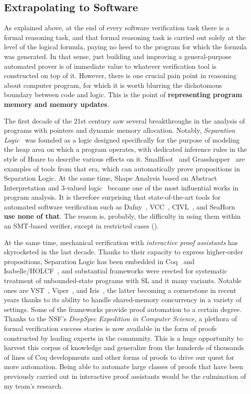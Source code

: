 \subsection{Extrapolating to Software}

As explained above, at the end of every software verification task there is a formal reasoning task, and that formal reasoning task is carried out solely at the level of the logical formula, paying no heed to the program for which the formula was generated.
In that sense, just building and improving a general-purpose automated prover is of immediate value to whatever verification tool is constructed on top of it.
However, there is one crucial pain point in reasoning about computer program, for which it is worth blurring the dichotomous boundary between code and logic.
This is the point of \textbf{representing program memory and memory updates}.

The first decade of the 21st century saw several breakthroughs in the analysis of programs with pointers and dynamic memory allocation.
Notably, \emph{Separation Logic}~\cite{Reynolds} was founded as a logic designed specifically for the purpose of modeling the heap area on which a program operates,
with dedicated inference rules in the style of Hoare to describe various effects on it.
Smallfoot~\cite{berdine} and Grasshopper~\cite{weis} are examples of tools from that era, which can automatically prove propositions in Separation Logic.
At the same time, Shape Analysis based on Abstract Interpretation and 3-valued logic~\cite{sagiv-reps} became one of the most influential works in program analysis.
It is therefore surprising that state-of-the-art tools for automated software verification such as Dafny~\cite{dafny}, VCC~\cite{vcc}, CIVL~\cite{civl}, and SeaHorn~\cite{seahorn} \textbf{use none of that}.
The reason is, probably, the difficulty in using them within an SMT-based verifier, except in restricted cases
(\eg \cite{CAV2013:Piskac}).

At the same time, mechanical verification with \emph{interactive proof assistants} has skyrocketed in the last decade.
Thanks to their capacity to express higher-order propositions, Separation Logic has been embedded in Coq~\cite{nanevski} and Isabelle/HOLCF~\cite{MFPS2008:Varming},
and substantial frameworks were erected for systematic treatment of unbounded-state programs with SL and it many variants.
Notable ones are VST~\cite{JAR2018:Cao}, Viper~\cite{viper}, and Iris~\cite{iris}, the latter becoming a cornerstone in recent years thanks to its ability to handle shared-memory concurrency in a variety of settings.
Some of the frameworks provide proof automation to a certain degree.
Thanks to the NSF's \emph{DeepSpec Expedition in Computer Science}, a plethora of formal verification success stories is now available in the form of proofs constructed by leading experts in the community.
This is a huge opportunity to harvest this corpus of knowledge and generalize from the hunderds of thousands of lines of Coq developments and other forms of proofs to drive our quest for more automation.
Being able to automate large classes of proofs that have been previously carried out in interactive proof assistants would be the culmination of my team's research.

